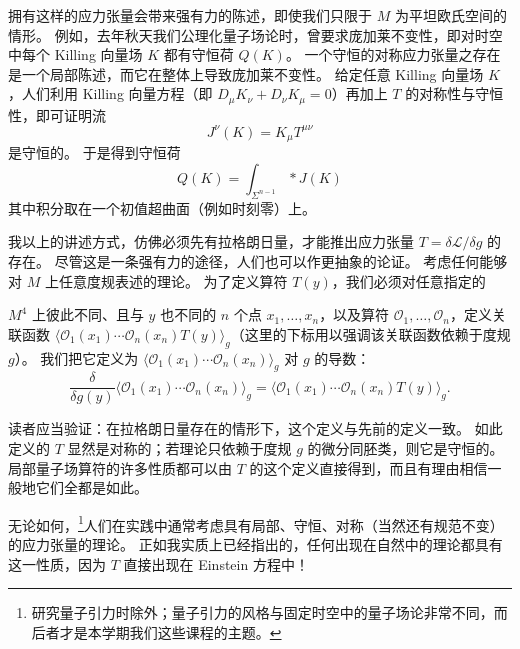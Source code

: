 拥有这样的应力张量会带来强有力的陈述，即使我们只限于 $M$ 为平坦欧氏空间的情形。
例如，去年秋天我们公理化量子场论时，曾要求庞加莱不变性，即对时空中每个 Killing 向量场 $K$ 都有守恒荷 $Q(K)$。
一个守恒的对称应力张量之存在是一个局部陈述，而它在整体上导致庞加莱不变性。
给定任意 Killing 向量场 $K$，人们利用 Killing 向量方程（即 $D_\mu K_\nu+D_\nu K_\mu=0$）再加上 $T$ 的对称性与守恒性，即可证明流
\[
  J^\nu(K)=K_\mu T^{\mu\nu}
\]
是守恒的。
于是得到守恒荷
\[
  Q(K)=\int_{\Sigma^{n-1}} *J(K)
\]
其中积分取在一个初值超曲面（例如时刻零）上。


我以上的讲述方式，仿佛必须先有拉格朗日量，才能推出应力张量 $T=\delta\mathcal{L}/\delta g$ 的存在。
尽管这是一条强有力的途径，人们也可以作更抽象的论证。
考虑任何能够对 $M$ 上任意度规表述的理论。
为了定义算符 $T(y)$，我们必须对任意指定的

$M^4$ 上彼此不同、且与 $y$ 也不同的 $n$ 个点 $x_1,\dots,x_n$，以及算符 $\mathcal{O}_1,\dots,\mathcal{O}_n$，定义关联函数 $\langle\mathcal{O}_1(x_1)\cdots\mathcal{O}_n(x_n)T(y)\rangle_g$（这里的下标用以强调该关联函数依赖于度规 $g$）。
我们把它定义为 $\langle\mathcal{O}_1(x_1)\cdots\mathcal{O}_n(x_n)\rangle_g$ 对 $g$ 的导数：
\[
  \frac{\delta}{\delta g(y)}\langle\mathcal{O}_1(x_1)\cdots\mathcal{O}_n(x_n)\rangle_g
  =\langle\mathcal{O}_1(x_1)\cdots\mathcal{O}_n(x_n)T(y)\rangle_g.
\]

读者应当验证：在拉格朗日量存在的情形下，这个定义与先前的定义一致。
如此定义的 $T$ 显然是对称的；若理论只依赖于度规 $g$ 的微分同胚类，则它是守恒的。
局部量子场算符的许多性质都可以由 $T$ 的这个定义直接得到，而且有理由相信一般地它们全都是如此。


无论如何，\footnote{研究量子引力时除外；量子引力的风格与固定时空中的量子场论非常不同，而后者才是本学期我们这些课程的主题。}人们在实践中通常考虑具有局部、守恒、对称（当然还有规范不变）的应力张量的理论。
正如我实质上已经指出的，任何出现在自然中的理论都具有这一性质，因为 $T$ 直接出现在 Einstein 方程中！

